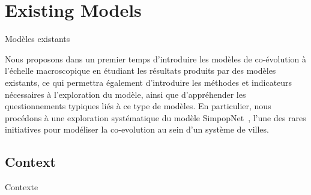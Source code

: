 




\newpage


\section{Existing Models}{Modèles existants}

\label{sec:macrocoevolexplo}



Nous proposons dans un premier temps d'introduire les modèles de co-évolution à l'échelle macroscopique en étudiant les résultats produits par des modèles existants, ce qui permettra également d'introduire les méthodes et indicateurs nécessaires à l'exploration du modèle, ainsi que d'appréhender les questionnements typiques liés à ce type de modèles. En particulier, nous procédons à une exploration systématique du modèle SimpopNet~\cite{schmitt2014modelisation}, l'une des rares initiatives pour modéliser la co-evolution au sein d'un système de villes.



\subsection{Context}{Contexte}


